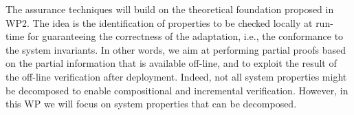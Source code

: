 \documentclass[12pt]{article}
\begin{document}


The assurance techniques will build on the theoretical foundation proposed in WP2.  
The idea is the identification of properties to be checked locally 
at 
run-time for guaranteeing the correctness of the adaptation, i.e., the conformance to the system invariants. In other words, 
we aim at performing 
partial proofs %
based on the partial information that is available off-line, and to exploit the result of the off-line verification after deployment. 
Indeed, not all system properties might be decomposed to enable compositional and incremental verification. However, in this WP we will focus on system properties that can be decomposed. 
\end{document}
